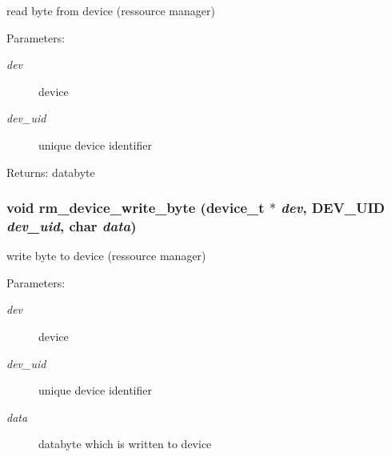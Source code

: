 read byte from device (ressource manager) 

\begin{Desc}
\item[Parameters:]
\begin{description}
\item[{\em dev}]device \item[{\em dev\_\-uid}]unique device identifier \end{description}
\end{Desc}
\begin{Desc}
\item[Returns:]databyte \end{Desc}
\hypertarget{group___d_e_v_i_c_e___a_p_i_g21fbe79e12278075a0999eb4650db12e}{
\subsubsection[{rm\_\-device\_\-write\_\-byte}]{\setlength{\rightskip}{0pt plus 5cm}void rm\_\-device\_\-write\_\-byte (device\_\-t $\ast$ {\em dev}, \/  {\bf DEV\_\-UID} {\em dev\_\-uid}, \/  char {\em data})}}
\label{group___d_e_v_i_c_e___a_p_i_g21fbe79e12278075a0999eb4650db12e}


write byte to device (ressource manager) 

\begin{Desc}
\item[Parameters:]
\begin{description}
\item[{\em dev}]device \item[{\em dev\_\-uid}]unique device identifier \item[{\em data}]databyte which is written to device \end{description}
\end{Desc}
